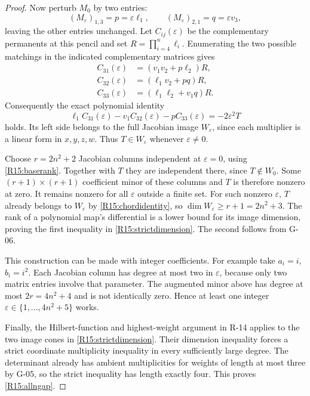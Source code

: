 \documentclass[11pt,a4paper]{article}
\theoremstyle{definition}\newtheorem{definition}{Definition}
\begin{document}
\begin{proof}
Now perturb $M_0$ by two entries:
\[
 (M_\varepsilon)_{1,3}=p=\varepsilon\ell_1,
 \qquad (M_\varepsilon)_{2,1}=q=\varepsilon v_3,
\]
leaving the other entries unchanged.
Let $C_{ij}(\varepsilon)$ be the complementary permanents at
this pencil and set $R=\prod_{i=4}^n\ell_i$.
Enumerating the two possible matchings in the indicated
complementary matrices gives
\[
 \begin{aligned}
 C_{31}(\varepsilon)&=(v_1v_2+p\ell_2)R,\\
 C_{32}(\varepsilon)&=(\ell_1v_2+pq)R,\\
 C_{33}(\varepsilon)&=(\ell_1\ell_2+v_1q)R.
 \end{aligned}
\]
Consequently the exact polynomial identity
\begin{equation}\label{R15:chordidentity}
 \ell_1C_{31}(\varepsilon)-v_1C_{32}(\varepsilon)
       -pC_{33}(\varepsilon)
       =-2\varepsilon^2T
\end{equation}
holds. Its left side belongs to the full Jacobian image
$W_\varepsilon$, since each multiplier is a linear form in
$x,y,z,w$. Thus $T\in W_\varepsilon$ whenever $\varepsilon\ne0$.

Choose $r=2n^2+2$ Jacobian columns independent at
$\varepsilon=0$, using \eqref{R15:baserank}.
Together with $T$ they are independent there, since
$T\notin W_0$. Some $(r+1)\times(r+1)$ coefficient minor of
these columns and $T$ is therefore nonzero at zero. It remains
nonzero for all $\varepsilon$ outside a finite set. For such
nonzero $\varepsilon$, $T$ already belongs to $W_\varepsilon$
by \eqref{R15:chordidentity}, so
$\dim W_\varepsilon\geq r+1=2n^2+3$.
The rank of a polynomial map's differential is a lower bound
for its image dimension, proving the first inequality in
\eqref{R15:strictdimension}. The second follows from G-06.

This construction can be made with integer coefficients.
For example take $a_i=i$, $b_i=i^2$.
Each Jacobian column has degree at most two in $\varepsilon$,
because only two matrix entries involve that parameter.
The augmented minor above has degree at most $2r=4n^2+4$ and
is not identically zero. Hence at least one integer
$\varepsilon\in\{1,\ldots,4n^2+5\}$ works.

Finally, the Hilbert-function and highest-weight argument in
R-14 applies to the two image cones in
\eqref{R15:strictdimension}. Their dimension inequality forces
a strict coordinate multiplicity inequality in every sufficiently
large degree. The determinant already has ambient multiplicities
for weights of length at most three by G-05, so the strict
inequality has length exactly four. This proves
\eqref{R15:allngap}.
\end{proof}
\end{document}
